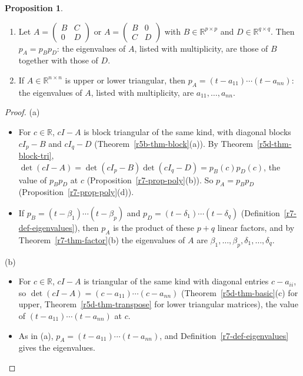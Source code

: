 \documentclass[12pt]{article}
\newcommand{\R}{\mathbb R}
\theoremstyle{definition}
\newtheorem{proposition}[theorem]{Proposition}
\begin{document}
\begin{proposition}\label{r7-prop-block-triangular}
\begin{enumerate}
\item Let \(A=\begin{pmatrix}B&C\\0&D\end{pmatrix}\) or \(A=\begin{pmatrix}B&0\\C&D\end{pmatrix}\) with \(B\in\R^{p\times p}\)
and \(D\in\R^{q\times q}\). Then \(p_A=p_Bp_D\): the eigenvalues of \(A\), listed with multiplicity, are those of \(B\)
together with those of \(D\).
\item If \(A\in\R^{n\times n}\) is upper or lower triangular, then \(p_A=(t-a_{11})\cdots(t-a_{nn})\): the eigenvalues of
\(A\), listed with multiplicity, are \(a_{11},\dots,a_{nn}\).
\end{enumerate}
\end{proposition}
\begin{proof}
(a)
\begin{itemize}
\item For \(c\in\R\), \(cI-A\) is block triangular of the same kind, with diagonal blocks \(cI_p-B\) and \(cI_q-D\)
(Theorem~\ref{r5b-thm-block}(a)). By Theorem~\ref{r5d-thm-block-tri},
\(\det(cI-A)=\det(cI_p-B)\det(cI_q-D)=p_B(c)p_D(c)\), the value of \(p_Bp_D\) at \(c\)
(Proposition~\ref{r7-prop-poly}(b)). So \(p_A=p_Bp_D\) (Proposition~\ref{r7-prop-poly}(d)).
\item If \(p_B=(t-\beta_1)\cdots(t-\beta_p)\) and \(p_D=(t-\delta_1)\cdots(t-\delta_q)\) (Definition~\ref{r7-def-eigenvalues}),
then \(p_A\) is the product of these \(p+q\) linear factors, and by Theorem~\ref{r7-thm-factor}(b) the eigenvalues of
\(A\) are \(\beta_1,\dots,\beta_p,\delta_1,\dots,\delta_q\).
\end{itemize}
(b)
\begin{itemize}
\item For \(c\in\R\), \(cI-A\) is triangular of the same kind with diagonal entries \(c-a_{ii}\), so
\(\det(cI-A)=(c-a_{11})\cdots(c-a_{nn})\) (Theorem~\ref{r5d-thm-basic}(c) for upper, Theorem~\ref{r5d-thm-transpose}
for lower triangular matrices), the value of \((t-a_{11})\cdots(t-a_{nn})\) at \(c\).
\item As in (a), \(p_A=(t-a_{11})\cdots(t-a_{nn})\), and Definition~\ref{r7-def-eigenvalues} gives the
eigenvalues.\qedhere
\end{itemize}
\end{proof}
\end{document}

